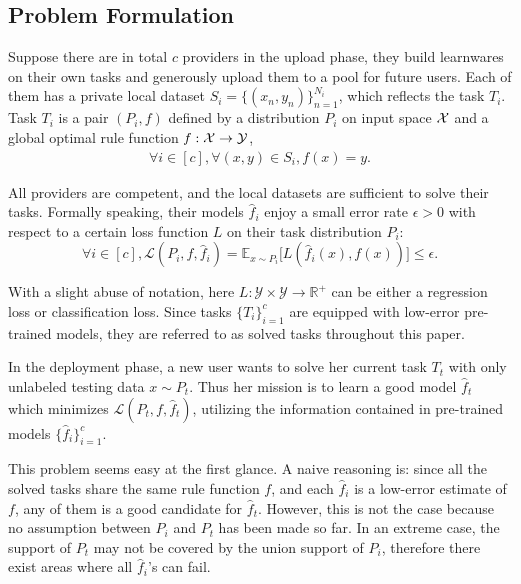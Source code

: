 \documentclass[paper=letter, fontsize=20pt]{article}
\begin{document}
\subsection{Problem Formulation}\label{sec:formulation}
Suppose there are in total $c$ providers in the upload phase, they build learnwares on their own tasks and generously upload them to a pool for future users. Each of them has a private local dataset $S_i=\{(x_n,y_n)\}_{n=1}^{N_i}$, which reflects the task $T_i$. Task $T_i$ is a pair $(P_i,f)$ defined by a distribution $P_i$ on input space $\mathcal{X}$ and a global optimal rule function $f:\mathcal{X} \rightarrow \mathcal{Y}$,
\begin{equation}
\begin{split}
     \forall i \in [c], \forall (x,y)\in S_i,f(x)=y.
\end{split} 
\end{equation}

All providers are competent, and the local datasets are sufficient to solve their tasks. Formally speaking, their models $\widehat{f}_i$ enjoy a small error rate $\epsilon>0$ with respect to a certain loss function $L$ on their task distribution $P_i$:
\begin{equation} \label{eq:small-loss}
     \forall i \in [c], \mathcal{L}(P_i,f,\widehat{f}_i)=\mathds{E}_{x\sim P_i }\big[L(\widehat{f}_i(x),f(x))\big]\leq \epsilon.
\end{equation} 

With a slight abuse of notation, here $L:\mathcal{Y}\times \mathcal{Y}\rightarrow \mathbb{R}^+$ can be either a regression loss or classification loss. Since tasks $\{T_i\}_{i=1}^c$ are equipped with low-error pre-trained models, they are referred to as solved tasks throughout this paper.

In the deployment phase, a new user wants to solve her current task $T_t$ with only unlabeled testing data $x\sim P_t$. Thus her mission is to learn a good model $\widehat{f}_t$ which minimizes $\mathcal{L}(P_t,f,\widehat{f}_t)$, utilizing the information contained in pre-trained models $\{\widehat{f}_i\}_{i=1}^c$.

This problem seems easy at the first glance. A naive reasoning is:  since all the solved tasks share the same rule function $f$, and each $\widehat{f}_i$ is a low-error estimate of $f$, any of them is a good candidate for $\widehat{f}_t$. However, this is not the case because no assumption between $P_i$ and $P_t$ has been made so far. In an extreme case, the support of $P_t$ may not be covered by the union support of $P_i$, therefore there exist areas where all $\widehat{f}_i$'s can fail.
\end{document}
